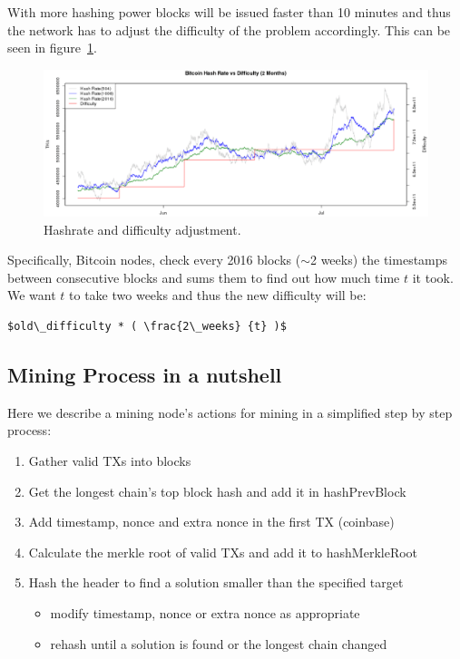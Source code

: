 With more hashing power blocks will be issued faster than 10 minutes and thus the network has to adjust the difficulty of the problem accordingly. This can be seen in figure~\ref{fig:hashrate-difficulty}.

\begin{figure}[h]
\begin{center}
\includegraphics[scale=0.25]{images/hashrate-difficulty}
\caption{Hashrate and difficulty adjustment.}
\label{fig:hashrate-difficulty}
\end{center}
\end{figure}

Specifically, Bitcoin nodes, check every 2016 blocks ($\sim$2 weeks) the timestamps between consecutive blocks and sums them to find out how much time $t$ it took. We want $t$ to take two weeks and thus the new difficulty will be:

\begin{emphbox}
\begin{lstlisting}[style=Pseudomath]
$old\_difficulty * ( \frac{2\_weeks} {t} )$
\end{lstlisting}
\end{emphbox}

\subsection*{Mining Process in a nutshell}
Here we describe a mining node's actions for mining in a simplified step by step process:

\begin{enumerate}
\item Gather valid TXs into blocks
\item Get the longest chain’s top block hash and add it in hashPrevBlock
\item Add timestamp, nonce and extra nonce in the first TX (coinbase)
\item Calculate the merkle root of valid TXs and add it to hashMerkleRoot
\item Hash the header to find a solution smaller than the specified target
  \begin{itemize}
  \item modify timestamp, nonce or extra nonce as appropriate
  \item rehash until a solution is found or the longest chain changed
  \end{itemize}
\end{enumerate}

